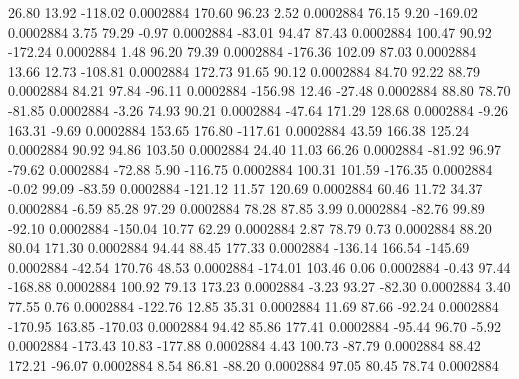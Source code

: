        26.80       13.92     -118.02     0.0002884
      170.60       96.23        2.52     0.0002884
       76.15        9.20     -169.02     0.0002884
        3.75       79.29       -0.97     0.0002884
      -83.01       94.47       87.43     0.0002884
      100.47       90.92     -172.24     0.0002884
        1.48       96.20       79.39     0.0002884
     -176.36      102.09       87.03     0.0002884
       13.66       12.73     -108.81     0.0002884
      172.73       91.65       90.12     0.0002884
       84.70       92.22       88.79     0.0002884
       84.21       97.84      -96.11     0.0002884
     -156.98       12.46      -27.48     0.0002884
       88.80       78.70      -81.85     0.0002884
       -3.26       74.93       90.21     0.0002884
      -47.64      171.29      128.68     0.0002884
       -9.26      163.31       -9.69     0.0002884
      153.65      176.80     -117.61     0.0002884
       43.59      166.38      125.24     0.0002884
       90.92       94.86      103.50     0.0002884
       24.40       11.03       66.26     0.0002884
      -81.92       96.97      -79.62     0.0002884
      -72.88        5.90     -116.75     0.0002884
      100.31      101.59     -176.35     0.0002884
       -0.02       99.09      -83.59     0.0002884
     -121.12       11.57      120.69     0.0002884
       60.46       11.72       34.37     0.0002884
       -6.59       85.28       97.29     0.0002884
       78.28       87.85        3.99     0.0002884
      -82.76       99.89      -92.10     0.0002884
     -150.04       10.77       62.29     0.0002884
        2.87       78.79        0.73     0.0002884
       88.20       80.04      171.30     0.0002884
       94.44       88.45      177.33     0.0002884
     -136.14      166.54     -145.69     0.0002884
      -42.54      170.76       48.53     0.0002884
     -174.01      103.46        0.06     0.0002884
       -0.43       97.44     -168.88     0.0002884
      100.92       79.13      173.23     0.0002884
       -3.23       93.27      -82.30     0.0002884
        3.40       77.55        0.76     0.0002884
     -122.76       12.85       35.31     0.0002884
       11.69       87.66      -92.24     0.0002884
     -170.95      163.85     -170.03     0.0002884
       94.42       85.86      177.41     0.0002884
      -95.44       96.70       -5.92     0.0002884
     -173.43       10.83     -177.88     0.0002884
        4.43      100.73      -87.79     0.0002884
       88.42      172.21      -96.07     0.0002884
        8.54       86.81      -88.20     0.0002884
       97.05       80.45       78.74     0.0002884
